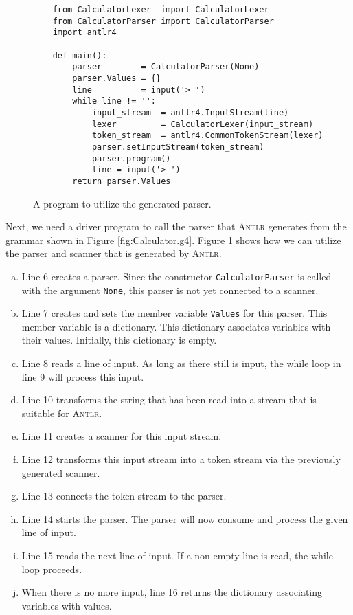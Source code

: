 \begin{figure}[!ht]
\centering
\begin{verbatim}
    from CalculatorLexer  import CalculatorLexer
    from CalculatorParser import CalculatorParser
    import antlr4
    
    def main():
        parser        = CalculatorParser(None)
        parser.Values = {}
        line          = input('> ')
        while line != '':
            input_stream  = antlr4.InputStream(line)
            lexer         = CalculatorLexer(input_stream)
            token_stream  = antlr4.CommonTokenStream(lexer)
            parser.setInputStream(token_stream)
            parser.program()
            line = input('> ')
        return parser.Values
\end{verbatim}
\vspace*{-0.3cm}
\caption{A program to utilize the generated parser.}
\label{fig:Calculator.ipynb}
\end{figure}

Next, we need a driver program to call the parser that \textsc{Antlr} generates from the grammar
shown in Figure \ref{fig:Calculator.g4}.  Figure \ref{fig:Calculator.ipynb} shows how we can utilize the parser
and scanner that is generated by \textsc{Antlr}.  
\begin{enumerate}[(a)]
\item Line 6 creates a parser.  Since the constructor \texttt{CalculatorParser} is called with the 
      argument \texttt{None}, this parser is not yet connected to a scanner.
\item Line 7 creates and sets the member variable \texttt{Values} for this parser.
      This member variable is a dictionary.  This dictionary associates variables with their values.
      Initially, this dictionary is empty.
\item Line 8 reads a line of input.  As long as there still is input, the while loop
      in line 9 will process this input.
\item Line 10 transforms the string that has been read into a stream that is suitable for \textsc{Antlr}.
\item Line 11 creates a scanner for this input stream.
\item Line 12 transforms this input stream into a token stream via the previously generated scanner.
\item Line 13 connects the token stream to the parser.
\item Line 14 starts the parser.  The parser will now consume and process the given line of
      input.  
\item Line 15 reads the next line of input.  If a non-empty line is read, the while loop proceeds.
\item When there is no more input, line 16 returns the dictionary associating variables with values. 
\end{enumerate}

